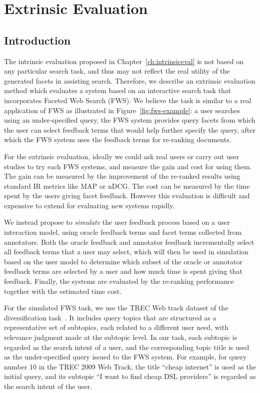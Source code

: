 \chapter{Extrinsic Evaluation}\label{ch:extrinsiceval}
\section{Introduction}
\label{sec:extrinsic}
The intrinsic evaluation proposed in Chapter~\ref{ch:intrinsiceval} is not based on any particular search task, and thus may not reflect the real utility of the generated facets in assisting search. Therefore, we describe an extrinsic evaluation method which evaluates a system based on an interactive search task that incorporates Faceted Web Search (FWS). We believe the task is similar to a real application of FWS as illustrated in Figure~\ref{fig:fws-example}: a user searches using an under-specified query, the FWS system provides query facets from which the user can select feedback terms that would help further specify the query, after which the FWS system uses the feedback terms for re-ranking documents.

For the extrinsic evaluation, ideally we could ask real users or carry out user studies to try each FWS systems, and measure the gain and cost for using them. The gain can be measured by the improvement of the re-ranked results using standard IR metrics like MAP or nDCG. The cost can be measured by the time spent by the users giving facet feedback. However this evaluation is difficult and expensive to extend for evaluating new systems rapidly.

We instead propose to \emph{simulate} the user feedback process based on a user interaction model, using oracle feedback terms and facet terms collected from annotators. Both the oracle feedback and annotator feedback incrementally select all feedback terms that a user may select, which will then be used in simulation based on the user model to determine which subset of the oracle or annotator feedback terms are selected by a user and how much time is spent giving that feedback. Finally, the systems are evaluated by the re-ranking performance together with the estimated time cost.

For the simulated FWS task, we use the TREC Web track dataset of the diversification task~\cite{clarke2009overview,clarke2010overview,clarke2011overview,clarke2012overview}. It includes query topics that are structured as a representative set of subtopics, each related to a different user need, with relevance judgment made at the subtopic level. In our task, each subtopic is regarded as the search intent of a user, and the corresponding topic title is used as the under-specified query issued to the FWS system. For example, for query number 10 in the TREC 2009 Web Track, the title ``cheap internet'' is used as the initial query, and its subtopic ``I want to find cheap DSL providers'' is regarded as the search intent of the user.


